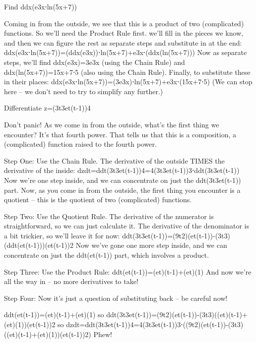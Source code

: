 \begin{example}
Find ddx(e3x⋅ln(5x+7))
\begin{solution} Coming in from the outside, we see that this is a product of two (complicated) functions. So we’ll need the Product Rule first. we’ll fill in the pieces we know, and then we can figure the rest as separate steps and substitute in at the end:
ddx(e3x⋅ln(5x+7))=(ddx(e3x))⋅ln(5x+7)+e3x⋅(ddx(ln(5x+7)))
Now as separate steps, we’ll find
ddx(e3x)=3e3x (using the Chain Rule)
and
ddx(ln(5x+7))=15x+7⋅5 (also using the Chain Rule).
Finally, to substitute these in their places:
ddx(e3x⋅ln(5x+7))=(3e3x)⋅ln(5x+7)+e3x⋅(15x+7⋅5)
(We can stop here – we don't need to try to simplify any further.)
\end{solution}\end{example}

\begin{example}
Differentiate z=(3t3et(t-1))4
\begin{solution} Don’t panic! As we come in from the outside, what’s the first thing we encounter? It’s that fourth power. That tells us that this is a composition, a (complicated) function raised to the fourth power.

Step One: Use the Chain Rule. The derivative of the outside TIMES the derivative of the inside:
dzdt=ddt(3t3et(t-1))4=4(3t3et(t-1))3⋅ddt(3t3et(t-1))
Now we’re one step inside, and we can concentrate on just the ddt(3t3et(t-1)) part. Now, as you come in from the outside, the first thing you encounter is a quotient – this is the quotient of two (complicated) functions.

Step Two: Use the Quotient Rule. The derivative of the numerator is straightforward, so we can just calculate it. The derivative of the denominator is a bit trickier, so we'll leave it for now:
ddt(3t3et(t-1))=(9t2)(et(t-1))-(3t3)(ddt(et(t-1)))(et(t-1))2
Now we’ve gone one more step inside, and we can concentrate on just the ddt(et(t-1)) part, which involves a product.

Step Three: Use the Product Rule:
ddt(et(t-1))=(et)(t-1)+(et)(1)
And now we’re all the way in – no more derivatives to take!

Step Four: Now it’s just a question of substituting back – be careful now!

ddt(et(t-1))=(et)(t-1)+(et)(1)
so
ddt(3t3et(t-1))=(9t2)(et(t-1))-(3t3)((et)(t-1)+(et)(1))(et(t-1))2
so
dzdt=ddt(3t3et(t-1))4=4(3t3et(t-1))3⋅((9t2)(et(t-1))-(3t3)((et)(t-1)+(et)(1))(et(t-1))2)
Phew!
\end{solution}\end{example}

